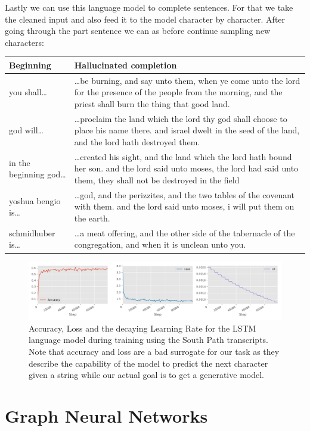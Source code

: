 \documentclass{article}
\begin{document}
Lastly we can use this language model to complete sentences. For that we take the cleaned input and also feed it to the model character by character. After going through the part sentence we can as before continue sampling new characters:

\begin{tabularx}{\linewidth}{lX}
  Beginning & Hallucinated completion\\ \toprule
  you shall\dots & \dots be burning, and say unto them, when ye come unto the lord for the presence of the people from the morning, and the priest shall burn the thing that good land.\\
  god will\dots & \dots proclaim the land which the lord thy god shall choose to place his name there. and israel dwelt in the seed of the land, and the lord hath destroyed them.\\
  in the beginning god\dots & \dots created his sight, and the land which the lord hath bound her son. and the lord said unto moses, the lord had said unto them, they shall not be destroyed in the field\\
  yoshua bengio is\dots & \dots god, and the perizzites, and the two tables of the covenant with them. and the lord said unto moses, i will put them on the earth.\\
  schmidhuber is\dots & \dots a meat offering, and the other side of the tabernacle of the congregation, and when it is unclean unto you.\\\bottomrule
\end{tabularx}

\begin{figure}
  \centering
  \includegraphics[width=\linewidth]{assignment_2/part2/results/southpark_2/southpark.pdf}
  \caption{Accuracy, Loss and the decaying Learning Rate for the LSTM language model during training using the South Path transcripts.
  Note that accuracy and loss are a bad surrogate for our task as they describe the capability of the model to predict the next character given a string while our actual goal is to get a generative model.}
  \label{fig:training_southpark}
\end{figure}

\section{Graph Neural Networks}
\end{document}
